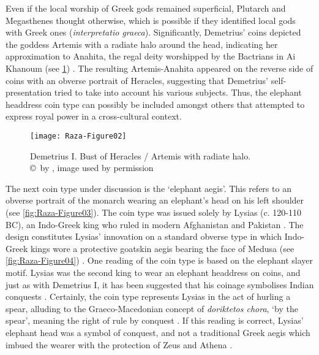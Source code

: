 \documentclass{ijsra}
\renewcommand\BC{{\,BC\xspace}}
\begin{document}
Even if the local worship of Greek gods remained superficial, Plutarch and Megasthenes thought otherwise, which is possible if they identified local gods with Greek ones (\emph{interpretatio graeca}).
Significantly, Demetrius’ coins depicted the goddess Artemis with a radiate halo around the head, indicating her approximation to Anahita, the regal deity worshipped by the Bactrians in Ai Khanoum (see \cref{fig:Raza-Figure02})  \parencites[242]{MacDowall2007b}[420]{Potter2003}.
The resulting Artemis-Anahita appeared on the reverse side of coins with an obverse portrait of Heracles, suggesting that Demetrius’ self-presentation tried to take into account his various subjects.
Thus, the elephant headdress coin type can possibly be included amongst others that attempted to express royal power in a cross-cultural context.

\begin{figure}[!htb] %
	\centering
	\texttt{[image: Raza-Figure02]}
	\caption{Demetrius I. Bust of Heracles / Artemis with radiate halo. 
		{\normalfont\scriptsize \\ \copyright\ by \cite{Coin}, image used by permission}}
	\label{fig:Raza-Figure02}
\end{figure}

The next coin type under discussion is the ‘elephant aegis’.
This refers to an obverse portrait of the monarch wearing an elephant’s head on his left shoulder (see \cref{fig:Raza-Figure03}).
The coin type was issued solely by Lysias (c. 120-110\BC), an Indo-Greek king who ruled in modern Afghanistan and Pakistan \parencite[121]{Mairs2014}.
The design constitutes Lysias’ innovation on a standard obverse type in which Indo-Greek kings wore a protective goatskin aegis bearing the face of Medusa (see \cref{fig:Raza-Figure04}) \parencite[35]{Whitehead1970}.
One reading of the coin type is based on the elephant slayer motif. Lysias was the second king to wear an elephant headdress on coins, and just as with Demetrius I, it has been suggested that his coinage symbolises Indian conquests \parencites[341]{Cribb2011}[107]{Widemann2003}.
Certainly, the coin type represents Lysias in the act of hurling a spear, alluding to the Graeco-Macedonian concept of \emph{doriktetos chora}, ‘by the spear’, meaning the right of rule by conquest \parencite[27]{Billows1995}.
If this reading is correct, Lysias’ elephant head was a symbol of conquest, and not a traditional Greek aegis which imbued the wearer with the protection of Zeus and Athena \parencite[185]{Holt1999}.
\end{document}
